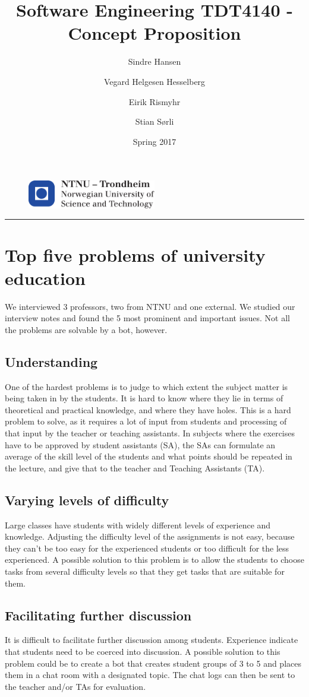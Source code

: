 \documentclass{article}
\title{Software Engineering TDT4140 - Concept Proposition}
\author{Sindre Hansen \and Vegard Helgesen Hesselberg \and Eirik Rismyhr \and Stian Sørli}
\date{Spring 2017}
\begin{document}
\begin{figure}
  \centering
  \includegraphics[width=0.5\textwidth]{images/logontnu_eng}
\end{figure}
\maketitle
\rule{\linewidth}{0.5mm}

\section{Top five problems of university education}
We interviewed 3 professors, two from NTNU and one external. We studied our interview notes and found the 5 most prominent and important issues. Not all the problems are solvable by a bot, however.

\subsection{Understanding}
One of the hardest problems is to judge to which extent the subject matter is being taken in by the students. It is hard to know where they lie in terms of theoretical and practical knowledge, and where they have holes. This is a hard problem to solve, as it requires a lot of input from students and processing of that input by the teacher or teaching assistants. In subjects where the exercises have to be approved by student assistants (SA), the SAs can formulate an average of the skill level of the students and what points should be repeated in the lecture, and give that to the teacher and Teaching Assistants (TA).

\subsection{Varying levels of difficulty}
Large classes have students with widely different levels of experience and knowledge. Adjusting the difficulty level of the assignments is not easy, because they can’t be too easy for the experienced students or too difficult for the less experienced. A possible solution to this problem is to allow the students to choose tasks from several difficulty levels so that they get tasks that are suitable for them.

\subsection{Facilitating further discussion}
It is difficult to facilitate further discussion among students. Experience indicate that students need to be coerced into discussion. A possible solution to this problem could be to create a bot that creates student groups of 3 to 5 and places them in a chat room with a designated topic. The chat logs can then be sent to the teacher and/or TAs for evaluation.
\end{document}
